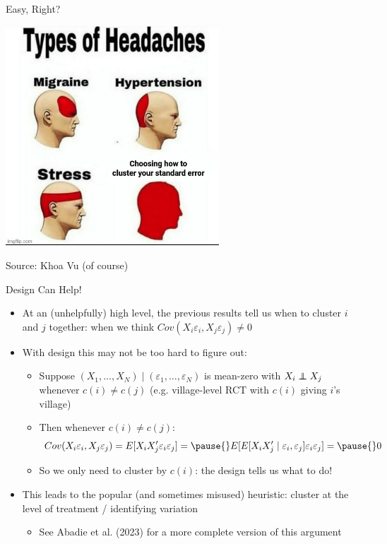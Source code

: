 \documentclass[11pt,english]{beamer}
\newcommand\independent{\protect\mathpalette{\protect\independenT}{\perp}}
\def\independenT#1#2{\mathrel{\rlap{$#1#2$}\mkern2mu{#1#2}}}
\begin{document}
\begin{frame}{Easy, Right?}

\begin{center}
	\includegraphics[width=0.6\textwidth]{figures/khoa_cluster.jpg}
\end{center}
\hspace{\fill}Source: Khoa Vu (of course)
\end{frame}

\begin{frame}{Design Can Help!} 
\begin{itemize}
\item At an (unhelpfully) high level, the previous results tell us when to cluster $i$ and $j$ together: when we think $Cov(X_i\varepsilon_i,X_j\varepsilon_j)\neq 0$\bigskip\pause{}
\item With design this may not be too hard to figure out:\smallskip
\begin{itemize}
\item Suppose $(X_1,\dots,X_N)
\mid (\varepsilon_1,\dots,\varepsilon_N)$ is mean-zero with $X_i\independent X_j$ whenever $c(i)\neq c(j)$ (e.g. village-level RCT with $c(i)$ giving $i$'s village)\smallskip\pause{}
\item Then whenever $c(i)\neq c(j)$: 
\begin{align*}
Cov(X_i\varepsilon_i,X_j\varepsilon_j)=E[X_iX_j^\prime\varepsilon_i\varepsilon_j]=\pause{}E[E[X_iX_j^\prime\mid \varepsilon_i,\varepsilon_j] \varepsilon_i\varepsilon_j]=\pause{} 0
\end{align*}\vspace{-0.6cm}\pause{}
\item So we only need to cluster by $c(i)$: the design tells us what to do!
\end{itemize}\bigskip\pause{}

\item This leads to the popular (and sometimes misused) heuristic: cluster at the level of treatment / identifying variation\smallskip
\begin{itemize}
\item See Abadie et al. (2023) for a more complete version of this argument 
\end{itemize}
\end{itemize}

\end{frame}
\end{document}
